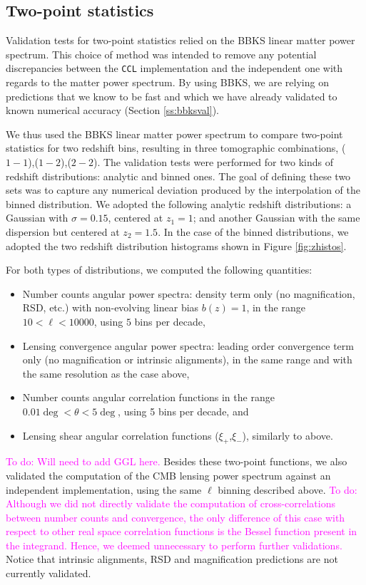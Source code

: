 \documentclass[\docopts]{\docclass}
\newcommand{\todo}[1]{\textcolor{magenta}{To do: #1}}
\newcommand{\ccl}{{\tt CCL}\xspace}
\begin{document}
\subsection{Two-point statistics}

Validation tests for two-point statistics relied on the BBKS linear matter power spectrum. This choice of method was intended to remove any potential discrepancies between the \ccl implementation and the independent one with regards to the matter power spectrum. By using BBKS, we are relying on predictions that we know to be fast and which we have already validated to known numerical accuracy (Section \ref{ss:bbksval}).

We thus used the BBKS linear matter power spectrum to compare two-point statistics for two redshift bins, resulting in three tomographic combinations, ($1-1$),($1-2$),($2-2$). The validation tests were performed for two kinds of redshift distributions: analytic and binned ones. The goal of defining these two sets was to capture any numerical deviation produced by the interpolation of the binned distribution. We adopted the following analytic redshift distributions: a Gaussian with $\sigma = 0.15$, centered at $z_1 = 1$; and another Gaussian with the same dispersion but centered at $z_2 = 1.5$. In the case of the binned distributions, we adopted the two redshift distribution histograms shown in Figure \ref{fig:zhistos}.

For both types of distributions, we computed the following quantities:
\begin{itemize}
\item Number counts angular power spectra: density term only (no magnification, RSD, etc.) with non-evolving linear bias $b(z) = 1$, in the range $10 < \ell < 10000$, using $5$ bins per decade,
\item Lensing convergence angular power spectra: leading order convergence term only (no magnification or intrinsic alignments), in the same range and with the same resolution as the case above,
\item Number counts angular correlation functions in the range $0.01 \deg < \theta < 5 \deg$, using 5 bins per decade, and
\item Lensing shear angular correlation functions ($\xi_+$,$\xi_-$), similarly to above.
\end{itemize}
\todo{Will need to add GGL here.}
Besides these two-point functions, we also validated the computation of the CMB lensing power spectrum against an independent implementation, using the same $\ell$ binning described above. \todo{Although we did not directly validate the computation of cross-correlations between number counts and convergence, the only difference of this case with respect to other real space correlation functions is the Bessel function present in the integrand. Hence, we deemed unnecessary to perform further validations.} Notice that intrinsic alignments, RSD and magnification predictions are not currently validated. 
\end{document}
